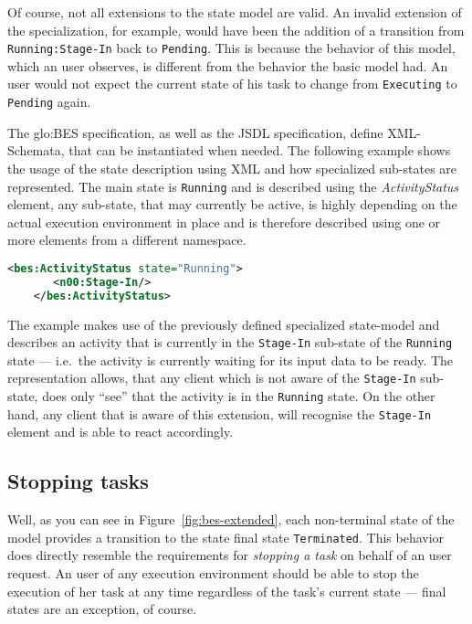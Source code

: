 Of course,  not all extensions to  the state model are  valid.  An invalid
extension of the specialization, for example, would have been the addition
of a  transition from \texttt{Running:Stage-In}  back to \texttt{Pending}.
This is  because the behavior  of this model,  which an user  observes, is
different from the behavior the basic  model had. An user would not expect
the  current  state of  his  task  to  change from  \texttt{Executing}  to
\texttt{Pending} again.

The \gls{glo:BES} specification, as well as the JSDL specification, define
XML-Schemata, that can be instantiated when needed.  The following example
shows the  usage of  the state description  using XML and  how specialized
sub-states  are represented.  The  main state  is \texttt{Running}  and is
described using the \emph{ActivityStatus} element, any sub-state, that may
currently  be  active,  is   highly  depending  on  the  actual  execution
environment in place and is therefore described using one or more elements
from a different namespace.

\begin{minipage}{0.75\textwidth}
  \begin{lstlisting}[language=XML]
    <bes:ActivityStatus state="Running">
       <n00:Stage-In/>
    </bes:ActivityStatus>
  \end{lstlisting}
\end{minipage}

The example  makes use of  the previously defined  specialized state-model
and  describes an  activity  that is  currently  in the  \texttt{Stage-In}
sub-state of the \texttt{Running} state --- i.e.~the activity is currently
waiting for its  input data to be ready.   The representation allows, that
any client  which is  not aware of  the \texttt{Stage-In}  sub-state, does
only ``see''  that the activity is  in the \texttt{Running}  state. On the
other hand, any client that is aware of this extension, will recognise the
\texttt{Stage-In} element and is able to react accordingly.


\subsection{Stopping tasks}
\label{sec:stopping-task}

Well, as  you can see in  Figure~\ref{fig:bes-extended}, each non-terminal
state  of  the  model provides  a  transition  to  the state  final  state
\texttt{Terminated}. This behavior does directly resemble the requirements
for \emph{stopping a  task} on behalf of an user  request.  An user of
any execution environment should be able to stop the execution of her task
at any time regardless of the task's current state --- final states are an
exception, of course.

